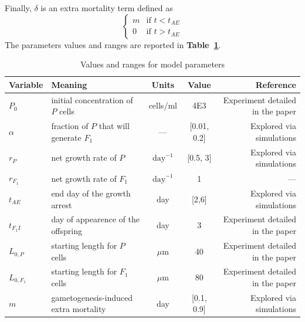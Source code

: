 \documentclass[a4paper,oneside]{article}
\begin{document}
    Finally, $\delta$ is an extra mortality term defined as
    \[
      \begin{cases}
        m & \mbox{if } t < t_{AE} \\
        0 & \mbox{if } t > t_{AE}
      \end{cases}
    \]
    The parameters values and ranges are reported in \textbf{Table~\ref{tbl1}}.
    \begin{table}
      \centering
      {%
        \begin{tabular}{@{}llccr@{}}
          \toprule
          \textbf{Variable}&\textbf{Meaning} & \textbf{Units} & \textbf{Value} & \textbf{Reference}\\
          \midrule
          ${P}_{0}$       & initial concentration of $P$ cells         & cells/ml          & 4E3         & Experiment detailed in the paper\\
          $\alpha$        & fraction of $P$ that will generate $F_{1}$ & ---               & [0.01, 0.2] & Explored via simulations\\
          $r_{P}$         & net growth rate of $P$                     & $\text{day}^{-1}$ & [0.5, 3]      & Explored via simulations\\ 
          $r_{F_{1}}$     & net growth rate of $F_{1}$                 & $\text{day}^{-1}$ & 1           & ---\\
          $t_{AE}$        & end day of the growth arrest               & day               & [2,6]       & Explored via simulations\\
          $t_{F_{1}I}$    & day of appearence of the offspring         & day               & 3           & Experiment detailed in the paper\\
          $L_{0,P}$       & starting length for $P$ cells              & $\mu$m            & 40          & Experiment detailed in the paper\\
          $L_{0,{F_{1}}}$ & starting length for $F_{1}$ cells          & $\mu$m            & 80          & Experiment detailed in the paper\\
          $m$             & gametogenesis-induced extra mortality      & day               & [0.1, 0.9]  & Explored via simulations\\
          \bottomrule
        \end{tabular}
       }
      \caption{Values and ranges for model parameters}\label{tbl1}
    \end{table}
%
\end{document}
